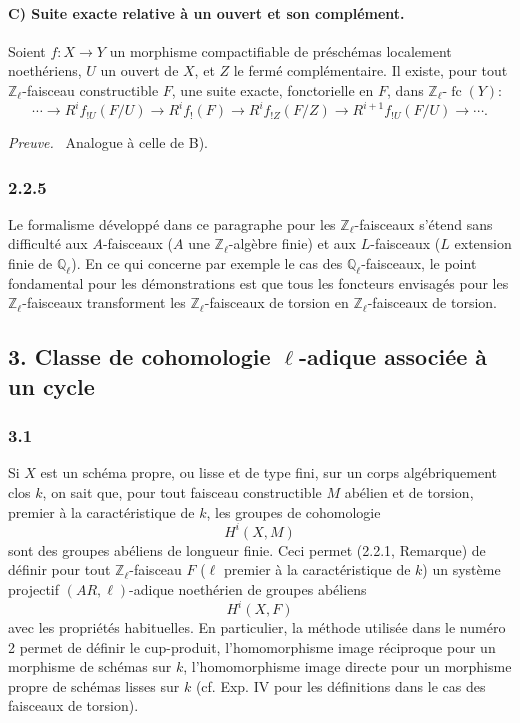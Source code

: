 \documentclass[11pt]{article}
\newenvironment{prooftext}[1][Proof]{\par\noindent\emph{#1.}\ }{\par\medskip}
\providecommand{\fc}{\operatorname{fc}}
\begin{document}
\paragraph{C) Suite exacte relative à un ouvert et son complément.}
Soient \(f:X\to Y\) un morphisme compactifiable de préschémas localement noethériens, \(U\) un ouvert de \(X\), et \(Z\) le fermé complémentaire. Il existe, pour tout \(\mathbb Z_\ell\)-faisceau constructible \(F\), une suite exacte, fonctorielle en \(F\), dans \(\mathbb Z_\ell\text{-}\fc(Y)\):
\[
\cdots\longrightarrow R^if_{!U}(F/U)
\longrightarrow R^if_!(F)
\longrightarrow R^if_{!Z}(F/Z)
\longrightarrow R^{i+1}f_{!U}(F/U)
\longrightarrow\cdots .
\]

\begin{prooftext}[Preuve]
Analogue à celle de B).
\end{prooftext}

\subsubsection*{2.2.5}
Le formalisme développé dans ce paragraphe pour les \(\mathbb Z_\ell\)-faisceaux s'étend sans difficulté aux \(A\)-faisceaux (\(A\) une \(\mathbb Z_\ell\)-algèbre finie) et aux \(L\)-faisceaux (\(L\) extension finie de \(\mathbb Q_\ell\)). En ce qui concerne par exemple le cas des \(\mathbb Q_\ell\)-faisceaux, le point fondamental pour les démonstrations est que tous les foncteurs envisagés pour les \(\mathbb Z_\ell\)-faisceaux transforment les \(\mathbb Z_\ell\)-faisceaux de torsion en \(\mathbb Z_\ell\)-faisceaux de torsion.

\subsection*{3. Classe de cohomologie \(\ell\)-adique associée à un cycle}

\subsubsection*{3.1}
Si \(X\) est un schéma propre, ou lisse et de type fini, sur un corps algébriquement clos \(k\), on sait que, pour tout faisceau constructible \(M\) abélien et de torsion, premier à la caractéristique de \(k\), les groupes de cohomologie
\[
H^i(X,M)
\]
sont des groupes abéliens de longueur finie. Ceci permet (2.2.1, Remarque) de définir pour tout \(\mathbb Z_\ell\)-faisceau \(F\) (\(\ell\) premier à la caractéristique de \(k\)) un système projectif \((AR,\ell)\)-adique noethérien de groupes abéliens
\[
H^i(X,F)
\]
avec les propriétés habituelles. En particulier, la méthode utilisée dans le numéro 2 permet de définir le cup-produit, l'homomorphisme image réciproque pour un morphisme de schémas sur \(k\), l'homomorphisme image directe pour un morphisme propre de schémas lisses sur \(k\) (cf. Exp. IV pour les définitions dans le cas des faisceaux de torsion).
\end{document}
